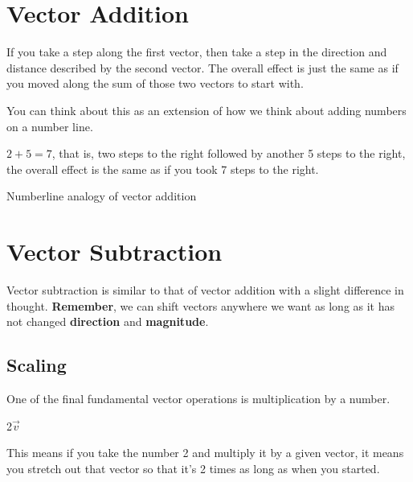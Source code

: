 \documentclass[12pt]{article}
\begin{document}
\section{Vector Addition}


If you take a step along the first vector, then take a step in the direction and distance described by the second vector. The overall effect is just the same as if you moved along the sum of those two vectors to start with.

You can think about this as an extension of how we think about adding numbers on a number line.


$2 + 5 = 7$, that is, two steps to the right followed by another 5 steps to the right, the overall effect is the same as if you took 7 steps to the right.

Numberline analogy of vector addition


\newpage

\section{Vector Subtraction}


Vector subtraction is similar to that of vector addition with a slight difference in thought. \textbf{Remember}, we can shift vectors anywhere we want as long as it has not changed \textbf{direction} and \textbf{magnitude}.


\begin{center}
    \section{Scaling}
\end{center}

One of the final fundamental vector operations is multiplication by a number. 

\begin{center}
    2$\vec{v}$
\end{center}

This means if you take the number 2 and multiply it by a given vector, it means you stretch out that vector so that it's 2 times as long as when you started.

\end{document}
